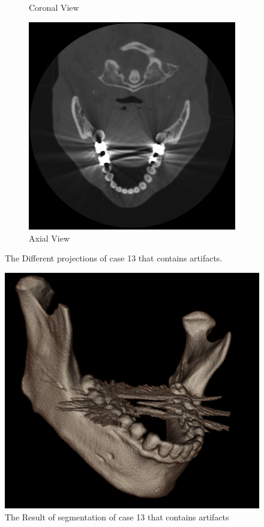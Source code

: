 \documentclass[11.5pt, b5paper]{article}
\begin{document}
\begin{figure}
\begin{subfigure}[b]{0.33\textwidth}
        \caption{Coronal View}
    \end{subfigure}
      \hfill
    \begin{subfigure}[b]{0.33\textwidth}
        \centering
        \includegraphics[width=\textwidth]{NTV}
        \caption{Axial View}
    \end{subfigure}
    \caption{The Different projections of case 13 that contains artifacts.}
    \label{fig:NV}
\end{figure}

\begin{figure}
\centering 
\includegraphics[scale=0.5]{NS}
\caption{The Result of segmentation of case 13 that contains artifacts}
\label{fig:NS}
\end{figure}
\end{document}
